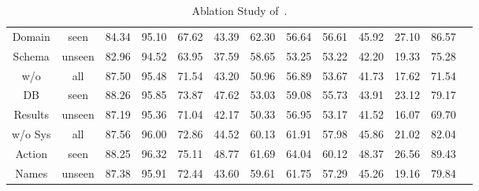 \begin{table}
\begin{adjustbox}{max width=\textwidth}
\begin{tabular}{|c|c|c|c|c|c|c|c|c|c|c|c|c|}
            {Domain}                  & seen    & 84.34                     & 95.10     & 67.62          & 43.39          & 62.30          & 56.64   & 56.61    & 45.92    & 27.10                     & 86.57    \\
            {Schema}                  & unseen  & 82.96                     & 94.52     & 63.95          & 37.59          & 58.65          & 53.25   & 53.22    & 42.20    & 19.33                     & 75.28    \\ \hline
            {w/o}                     & all     & 87.50                     & 95.48     & 71.54          & 43.20          & 50.96          & 56.89   & 53.67    & 41.73    & 17.62                     & 71.54    \\
            {DB}                      & seen    & 88.26                     & 95.85     & 73.87          & 47.62          & 53.03          & 59.08   & 55.73    & 43.91    & 23.12                     & 79.17    \\
            {Results}                 & unseen  & 87.19                     & 95.36     & 71.04          & 42.17          & 50.33          & 56.95   & 53.17    & 41.52    & 16.07                     & 69.70    \\ \hline
            {w/o Sys}                 & all     & 87.56                     & 96.00     & 72.86          & 44.52          & 60.13          & 61.91   & 57.98    & 45.86    & 21.02                     & 82.04    \\
            {Action}                  & seen    & 88.25                     & 96.32     & 75.11          & 48.77          & 61.69          & 64.04   & 60.12    & 48.37    & 26.56                     & 89.43    \\
            {Names}                   & unseen  & 87.38                     & 95.91     & 72.44          & 43.60          & 59.61          & 61.75   & 57.29    & 45.26    & 19.16                     & 79.84    \\ \hline
        \end{tabular}
    \end{adjustbox}
    \caption{Ablation Study of~\oursys.}
    \label{tab:ablation-results}
\end{table}


